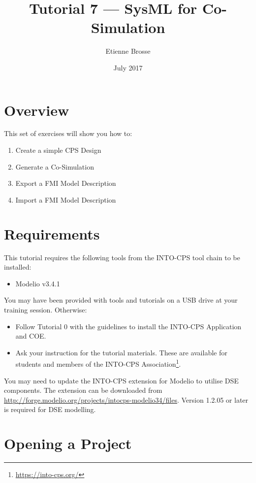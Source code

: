 \documentclass[11pt,a4paper]{../tutorial}
\title{Tutorial 7 --- SysML for Co-Simulation}
\date{July 2017}
\author{Etienne Brosse}
\begin{document}
\section*{Overview}

This set of exercises will show you how to:

\begin{enumerate}[noitemsep]
\item Create a simple CPS Design
\item Generate a Co-Simulation
\item Export a FMI Model Description
\item Import a FMI Model Description

\end{enumerate}

\section*{Requirements}

This tutorial requires the following tools from the INTO-CPS tool chain to be installed:

\begin{itemize}[noitemsep]
\item Modelio v3.4.1
\end{itemize}

You may have been provided with tools and tutorials on a USB drive at your training session. Otherwise: 
\begin{itemize}[noitemsep]
\item Follow Tutorial 0 with the guidelines to install the INTO-CPS Application and COE.
\item Ask your instruction for the tutorial materials. These are available for students and members of the INTO-CPS Association\footnote{\url{https://into-cps.org/}}.
\end{itemize}

\vspace{4mm}

You may need to update the INTO-CPS extension for Modelio to utilise DSE components. The extension can be downloaded from \mbox{\url{http://forge.modelio.org/projects/intocps-modelio34/files}}. Version 1.2.05 or later is required for DSE modelling.

\newpage

\section{Opening a Project}
\end{document}
